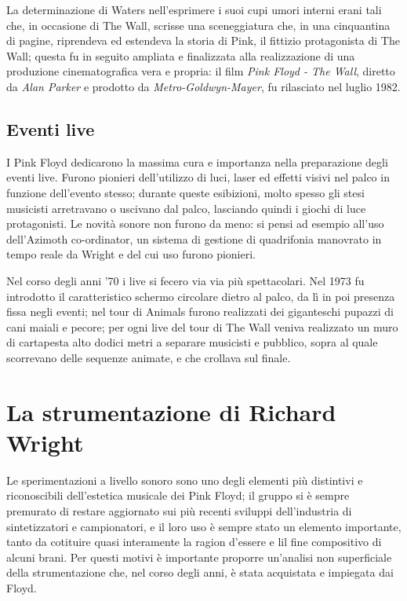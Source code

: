 \documentclass[class=book, crop=false, oneside, 12pt]{standalone}
\begin{document}
    La determinazione di Waters nell'esprimere i suoi cupi umori interni erani tali che, in occasione di The Wall, scrisse una sceneggiatura che, in una cinquantina di pagine, riprendeva ed estendeva la storia di Pink, il fittizio protagonista di The Wall; questa fu in seguito ampliata e finalizzata alla realizzazione di una produzione cinematografica vera e propria: il film \emph{Pink Floyd - The Wall}, diretto da \emph{Alan Parker} e prodotto da \emph{Metro-Goldwyn-Mayer}, fu rilasciato nel luglio 1982.

    \subsection{Eventi live}
    I Pink Floyd dedicarono la massima cura e importanza nella preparazione degli eventi live. Furono pionieri dell'utilizzo di luci, laser ed effetti visivi nel palco in funzione dell'evento stesso; durante queste esibizioni, molto spesso gli stesi musicisti arretravano o uscivano dal palco, lasciando quindi i giochi di luce protagonisti. Le novità sonore non furono da meno: si pensi ad esempio all'uso dell'Azimoth co-ordinator, un sistema di gestione di quadrifonia manovrato in tempo reale da Wright e del cui uso furono pionieri.

    Nel corso degli anni '70 i live si fecero via via più spettacolari. Nel 1973 fu introdotto il caratteristico schermo circolare dietro al palco, da lì in poi presenza fissa negli eventi; nel tour di Animals furono realizzati dei giganteschi pupazzi di cani maiali e pecore; per ogni live del tour di The Wall veniva realizzato un muro di cartapesta alto dodici metri a separare musicisti e pubblico, sopra al quale scorrevano delle sequenze animate, e che crollava sul finale.

    

    \section{La strumentazione di Richard Wright}
    Le sperimentazioni a livello sonoro sono uno degli elementi più distintivi e riconoscibili dell'estetica musicale dei Pink Floyd; il gruppo si è sempre premurato di restare aggiornato sui più recenti sviluppi dell'industria di sintetizzatori e campionatori, e il loro uso è sempre stato un elemento importante, tanto da cotituire quasi interamente la ragion d'essere e lil fine compositivo di alcuni brani. Per questi motivi è importante proporre un'analisi non superficiale della strumentazione che, nel corso degli anni, è stata acquistata e impiegata dai Floyd.
\end{document}
